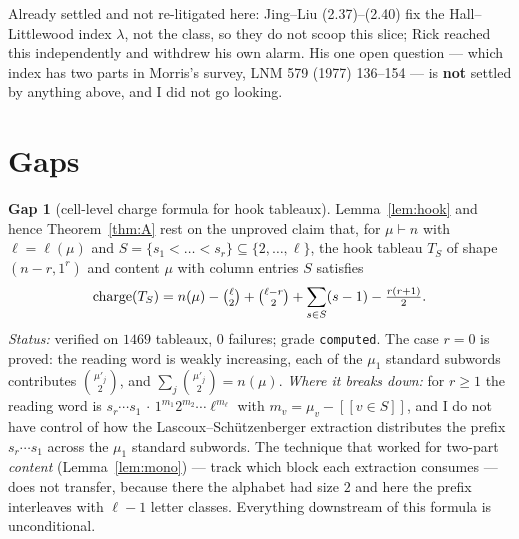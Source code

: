 \documentclass[11pt]{article}
\theoremstyle{plain}
\theoremstyle{definition}
\newtheorem{gap}[theorem]{Gap}
\DeclareMathOperator{\ch}{charge}
\newcommand{\lam}{\lambda}
\newcommand{\lb}{[\![}
\newcommand{\rb}{]\!]}
\begin{document}
Already settled and not re-litigated here: Jing--Liu (2.37)--(2.40) fix the Hall--Littlewood
index $\lam$, not the class, so they do not scoop this slice; Rick reached this independently and
withdrew his own alarm. His one open question --- which index has two parts in Morris's survey,
LNM 579 (1977) 136--154 --- is \textbf{not} settled by anything above, and I did not go looking.

\section{Gaps}

\begin{gap}[cell-level charge formula for hook tableaux]\label{gap:charge}
Lemma~\ref{lem:hook} and hence Theorem~\ref{thm:A} rest on the unproved claim that, for
$\mu\vdash n$ with $\ell=\ell(\mu)$ and $S=\{s_1<\dots<s_r\}\subseteq\{2,\dots,\ell\}$, the hook
tableau $T_S$ of shape $(n-r,1^r)$ and content $\mu$ with column entries $S$ satisfies
\[
  \ch(T_S)=n(\mu)-\tbinom{\ell}{2}+\tbinom{\ell-r}{2}+\sum_{s\in S}(s-1)-\tfrac{r(r+1)}{2}.
\]
\emph{Status:} verified on $1469$ tableaux, $0$ failures; grade \texttt{computed}. The case $r=0$
is proved: the reading word is weakly increasing, each of the $\mu_1$ standard subwords
contributes $\binom{\mu'_j}{2}$, and $\sum_j\binom{\mu'_j}{2}=n(\mu)$. \emph{Where it breaks
down:} for $r\ge 1$ the reading word is $s_r\cdots s_1\,\cdot\,1^{m_1}2^{m_2}\cdots\ell^{m_\ell}$
with $m_v=\mu_v-\lb v\in S\rb$, and I do not have control of how the Lascoux--Sch\"utzenberger
extraction distributes the prefix $s_r\cdots s_1$ across the $\mu_1$ standard subwords. The
technique that worked for two-part \emph{content} (Lemma~\ref{lem:mono}) --- track which block
each extraction consumes --- does not transfer, because there the alphabet had size $2$ and here
the prefix interleaves with $\ell-1$ letter classes. Everything downstream of this formula is
unconditional.
\end{gap}
\end{document}
